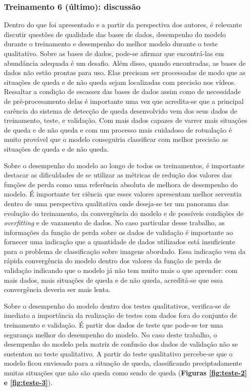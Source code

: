 \documentclass[12pt]{article}
\begin{document}
\subsubsection{Treinamento 6 (último): discussão}
Dentro do que foi apresentado e a partir da perspectiva dos autores, é relevante discutir questões de qualidade das bases de dados, desempenho do modelo durante o treinamento e desempenho do melhor modelo durante o teste qualitativo. Sobre as bases de dados, pode-se afirmar que encontrá-las em abundância adequada é um desafio. Além disso, quando encontradas, as bases de dados não estão prontas para uso. Elas precisam ser processadas de modo que as situações de queda e de não queda sejam localizadas com precisão nos vídeos. Ressaltar a condição de escassez das bases de dados assim como de necessidade de pré-procesamento delas é importante uma vez que acredita-se que a principal carência do sistema de detecção de queda desenvolvido vem dos seus dados de treinamento, teste, e validação. Com mais dados capazes de varrer mais situações de queda e de não queda e com um processo mais cuidadoso de rotualação é muito provável que o modelo conseguiria classificar com melhor precisão as situações de queda e de não queda.

Sobre o desempenho do modelo ao longo de todos os treinamentos, é importante destacar as dificuldades de se utilizar as métricas de redução dos valores das funções de perda como uma referência absoluta de melhora de desempenho do modelo. É importante ter ciência que esses valores apresentam melhor serventia dentro de uma perspectiva qualitativa onde deseja-se ter um panorama das evolução do treinamento, da convergência do modelo e de possíveis condições de \textit{overfitting} e de vazamento de dados. No caso particular desse trabalho, as informações da função de perda sobre os dados de validação é importante ao fornecer uma indicação que a quantidade de dados utilizados está insuficiente para o problema de classificação sobre imagens abordado. Essa indicação vem da rápida convergência do modelo dentro dos valores da função de perda de validação indicando que o modelo já não tem muito mais o que aprender: com mais dados, mais situações de queda e de não queda, acreditá-se que essa convergência deveria ser mais lenta.

Sobre o desempenho do modelo dentro dos testes qualitativos, verifica-se de imediato a importância da realização de testes com dados fora do conjunto de treinamento e validação. É partir dos dados de teste que pode-se ter uma segurança melhor do desempenho do modelo. No caso deste trabalho, o desempenho do modelo pela matriz de confusão dos dados de validação não se sustentou no teste qualitativo. A partir do teste qualitativo percebe-se que o modelo ficou enviesado para a situação de queda, classificando preciptadamente muitas situações que não são queda como sendo de queda (\textbf{Figuras \ref{fig:teste-2} e \ref{fig:teste-3}}). 
\end{document}

